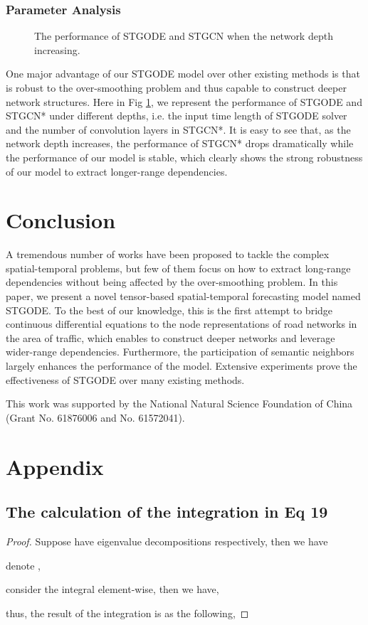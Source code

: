 \documentclass[sigconf]{acmart}
\theoremstyle{definition}
\begin{document}
\subsubsection{Parameter Analysis}
\begin{figure}
  \centering
  \caption{The performance of STGODE and STGCN when the network depth increasing.}\label{fig:analysis_t}
\end{figure}
One major advantage of our STGODE model over other existing methods is that is robust to the over-smoothing problem and thus capable to construct deeper network structures. Here in Fig \ref{fig:analysis_t}, we represent the performance of STGODE and STGCN* under different depths, i.e. the input time length of STGODE solver and the number of convolution layers in STGCN*. It is easy to see that, as the network depth increases, the performance of STGCN* drops dramatically while the performance of our model is stable, which clearly shows the strong robustness of our model to extract longer-range dependencies.


\section{Conclusion}
A tremendous number of works have been proposed to tackle the complex spatial-temporal problems, but few of them focus on how to extract long-range dependencies without being affected by the over-smoothing problem. In this paper, we present a novel tensor-based spatial-temporal forecasting model named STGODE. To the best of our knowledge, this is the first attempt to bridge continuous differential equations to the node representations of road networks in the area of traffic, which enables to construct deeper networks and leverage wider-range dependencies. Furthermore, the participation of semantic neighbors largely enhances the performance of the model. Extensive experiments prove the effectiveness of STGODE over many existing methods.

\begin{acks}
This work was supported by the National Natural Science Foundation of China (Grant No. 61876006 and No. 61572041).
\end{acks}




\newpage
\section{Appendix}
\subsection{The calculation of the integration in Eq 19}
\begin{proof}
Suppose  have eigenvalue decompositions  respectively, then we have

denote , 

consider the integral element-wise, then we have,  

thus, the result of the integration is as the following,


\end{proof}
\end{document}
